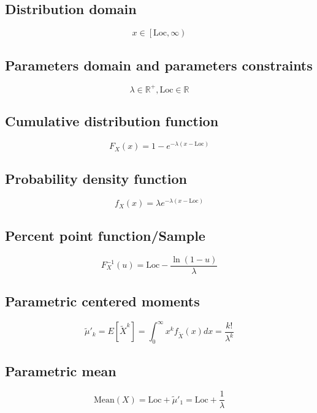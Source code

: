 \documentclass{article}
\begin{document}
\subsection{Distribution domain}
\begin{equation*} x\in\left[\text{Loc},\infty\right) \end{equation*}
\subsection{Parameters domain and parameters constraints}
\begin{equation*} \lambda\in\mathbb{R}^{+}, \text{Loc}\in\mathbb{R} \end{equation*}
\subsection{Cumulative distribution function}
\begin{equation*} F_{X}\left(x\right)=1-e^{-\lambda (x-\text{Loc})} \end{equation*}
\subsection{Probability density function}
\begin{equation*} f_{X}\left(x\right)=\lambda e^{-\lambda (x-\text{Loc})} \end{equation*}
\subsection{Percent point function/Sample}
\begin{equation*} F^{-1}_{X}\left(u\right)=\text{Loc}-\frac{\ln(1-u)}{\lambda} \end{equation*}
\subsection{Parametric centered moments}
\begin{equation*} \tilde{\mu}'_{k}=E[\tilde{X}^k]=\int_{0}^{\infty}x^{k}f_{\tilde{X}}\left(x\right)dx=\frac{k!}{\lambda^{k}} \end{equation*}
\subsection{Parametric mean}
\begin{equation*} \mathrm{Mean}(X)=\text{Loc}+\tilde{\mu}'_{1}=\text{Loc}+\frac{1}{\lambda} \end{equation*}
\end{document}
